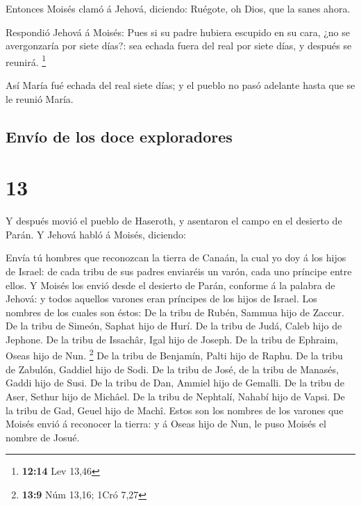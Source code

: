  Entonces Moisés clamó á Jehová, diciendo: Ruégote, oh
Dios, que la sanes ahora.

 Respondió Jehová á Moisés: Pues si su padre hubiera
escupido en su cara, ¿no se avergonzaría por siete días?: sea echada
fuera del real por siete días, y después se reunirá. \footnote{\textbf{12:14}
  Lev 13,46}

 Así María fué echada del real siete días; y el pueblo no
pasó adelante hasta que se le reunió María. 

\hypertarget{envuxedo-de-los-doce-exploradores}{%
\subsection{Envío de los doce
exploradores}\label{envuxedo-de-los-doce-exploradores}}

\hypertarget{section-12}{%
\section{13}\label{section-12}}

 Y después movió el pueblo de Haseroth, y asentaron el campo
en el desierto de Parán.  Y Jehová habló á Moisés, diciendo:

 Envía tú hombres que reconozcan la tierra de Canaán, la
cual yo doy á los hijos de Israel: de cada tribu de sus padres enviaréis
un varón, cada uno príncipe entre ellos.  Y Moisés los envió
desde el desierto de Parán, conforme á la palabra de Jehová: y todos
aquellos varones eran príncipes de los hijos de Israel.  Los
nombres de los cuales son éstos: De la tribu de Rubén, Sammua hijo de
Zaccur.  De la tribu de Simeón, Saphat hijo de Hurí.
 De la tribu de Judá, Caleb hijo de Jephone.  De
la tribu de Issachâr, Igal hijo de Joseph.  De la tribu de
Ephraim, Oseas hijo de Nun. \footnote{\textbf{13:9} Núm 13,16; 1Cró 7,27}
 De la tribu de Benjamín, Palti hijo de Raphu.
 De la tribu de Zabulón, Gaddiel hijo de Sodi.
 De la tribu de José, de la tribu de Manasés, Gaddi hijo de
Susi.  De la tribu de Dan, Ammiel hijo de Gemalli.
 De la tribu de Aser, Sethur hijo de Michâel. 
De la tribu de Nephtalí, Nahabí hijo de Vapsi.  De la tribu
de Gad, Geuel hijo de Machî.  Estos son los nombres de los
varones que Moisés envió á reconocer la tierra: y á Oseas hijo de Nun,
le puso Moisés el nombre de Josué.

